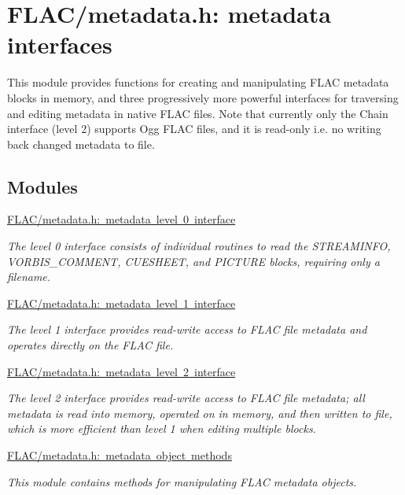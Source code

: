 \hypertarget{group__flac__metadata}{}\section{F\+L\+A\+C/metadata.h\+: metadata interfaces}
\label{group__flac__metadata}


This module provides functions for creating and manipulating F\+L\+AC metadata blocks in memory, and three progressively more powerful interfaces for traversing and editing metadata in native F\+L\+AC files. Note that currently only the Chain interface (level 2) supports Ogg F\+L\+AC files, and it is read-\/only i.\+e. no writing back changed metadata to file.  


\subsection*{Modules}
\begin{DoxyCompactItemize}
\item 
\mbox{\hyperlink{group__flac__metadata__level0}{F\+L\+A\+C/metadata.\+h\+: metadata level 0 interface}}
\begin{DoxyCompactList}\small\item\em The level 0 interface consists of individual routines to read the S\+T\+R\+E\+A\+M\+I\+N\+FO, V\+O\+R\+B\+I\+S\+\_\+\+C\+O\+M\+M\+E\+NT, C\+U\+E\+S\+H\+E\+ET, and P\+I\+C\+T\+U\+RE blocks, requiring only a filename. \end{DoxyCompactList}\item 
\mbox{\hyperlink{group__flac__metadata__level1}{F\+L\+A\+C/metadata.\+h\+: metadata level 1 interface}}
\begin{DoxyCompactList}\small\item\em The level 1 interface provides read-\/write access to F\+L\+AC file metadata and operates directly on the F\+L\+AC file. \end{DoxyCompactList}\item 
\mbox{\hyperlink{group__flac__metadata__level2}{F\+L\+A\+C/metadata.\+h\+: metadata level 2 interface}}
\begin{DoxyCompactList}\small\item\em The level 2 interface provides read-\/write access to F\+L\+AC file metadata; all metadata is read into memory, operated on in memory, and then written to file, which is more efficient than level 1 when editing multiple blocks. \end{DoxyCompactList}\item 
\mbox{\hyperlink{group__flac__metadata__object}{F\+L\+A\+C/metadata.\+h\+: metadata object methods}}
\begin{DoxyCompactList}\small\item\em This module contains methods for manipulating F\+L\+AC metadata objects. \end{DoxyCompactList}\end{DoxyCompactItemize}


